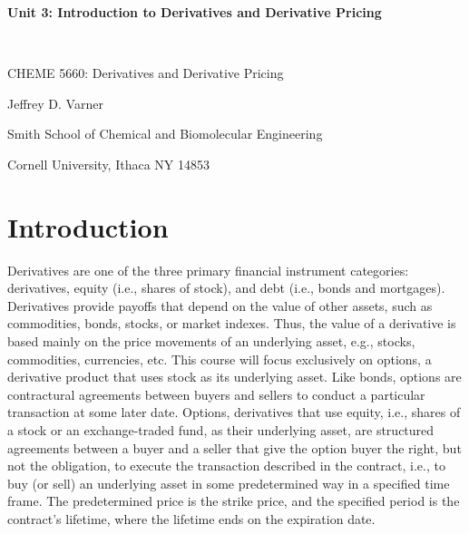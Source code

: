 \documentclass[11pt]{article}
\theoremstyle{definition}
\begin{document}
{\par\centering\textbf{\Large Unit 3: Introduction to Derivatives and Derivative Pricing}}\\
{\par \centering \large{CHEME 5660: Derivatives and Derivative Pricing}}
\vspace{0.2in}
{\par \centering \large{Jeffrey D. Varner}}
\vspace{0.05in}
{\par \centering \large{Smith School of Chemical and Biomolecular Engineering}}
{\par \centering \large{Cornell University, Ithaca NY 14853}}

\date{}
\thispagestyle{empty}

\setcounter{page}{1}

\section{Introduction}
Derivatives are one of the three primary financial instrument categories: derivatives, equity (i.e., shares of stock), and debt (i.e., bonds and mortgages). 
Derivatives provide payoffs that depend on the value of other assets, such as commodities, bonds, stocks, or market indexes. 
Thus, the value of a derivative is based mainly on the price movements of an underlying asset, e.g., stocks, commodities, currencies, etc. 
This course will focus exclusively on options, a derivative product that uses stock as its underlying asset. 
Like bonds, options are contractural agreements between buyers and sellers to conduct a particular transaction at some later date. 
Options, derivatives that use equity, i.e., shares of a stock or an exchange-traded fund, as their underlying asset, 
are structured agreements between a buyer and a seller that give the option buyer the right, but not the obligation, 
to execute the transaction described in the contract, i.e., to buy (or sell) an underlying asset in some predetermined way in a specified time frame. 
The predetermined price is the strike price, and the specified period is the contract's lifetime, where the lifetime ends on the expiration date. 
\end{document}
